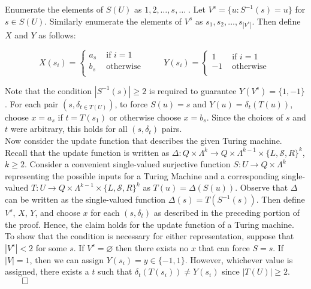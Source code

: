\documentclass[11pt]{article}
\let\emptyset\varnothing
\begin{document}

Enumerate the elements of $ S(U) $ as $ 1, 2, \dots, s, \dots \; $. Let $ V^s = \{u : S^{-1}(s) = u \} $ for $ s \in S(U) $. Similarly enumerate the elements of $ V^s $ as $ s_1, s_2, \dots , s_{|V^{s}|}$. Then define $ X $ and $ Y $ as follows:

\begin{equation*}
X(s_i) = \begin{cases}
       a_s & \text{ if } i = 1 \\
       b_s & \text{ otherwise } \\
       \end{cases} \quad \quad 
Y(s_i) = \begin{cases}
       1 & \text{ if } i = 1 \\
       -1 & \text{ otherwise } \\
       \end{cases} 
\end{equation*}

\bigskip
Note that the condition $ |S^{-1}(s)| \geq 2 $ is required to guarantee $ Y(V^s) = \{1, -1\} $. For each pair $ (s, \delta_{t \in T(U)} ) $, to force $ S(u) = s $ and $ Y(u) = \delta_{t}(T(u)) $, choose $ x = a_s $ if $ t = T(s_1) $ or otherwise choose $ x = b_s $. Since the choices of $ s $ and $ t $ were arbitrary, this holds for all $ (s, \delta_t) $ pairs. \\

Now consider the update function that describes the given Turing machine. Recall that the update function is written as $ \Delta: Q \times \Lambda^{k} \rightarrow Q \times \Lambda^{k - 1} \times \{ L, \mathcal{S}, R \} ^{k} $, $ k \geq 2 $. Consider a convenient single-valued surjective function $ S: U \rightarrow Q \times \Lambda^{k} $ representing the possible inputs for a Turing Machine and a corresponding single-valued $ T: U \rightarrow Q \times \Lambda^{k - 1} \times \{ L, \mathcal{S}, R \}^ {k} $ as $ T(u) = \Delta(S(u)) $. Observe that $ \Delta $ can be written as the single-valued function $ \Delta(s) = T(S^{-1}(s)) $. Then define $ V^s $, $ X $, $ Y $, and choose $ x $ for each $ (s, \delta_t ) $ as described in the preceding portion of the proof. Hence, the claim holds for the update function of a Turing machine.\\

To show that the condition is necessary for either representation, suppose that $|V^s| < 2$ for some $ s $. If $ V^s = \emptyset $ then there exists no $ x $ that can force $ S = s $. If $ |V| = 1 $, then we can assign $ Y(s_i) = y \in \{-1, 1\} $. However, whichever value is assigned, there exists a $ t $ such that $ \delta_{t}(T(s_i)) \neq Y(s_i) $ since $ |T(U)| \geq 2 $. $ \hfill \qed $ \\
\end{document}
